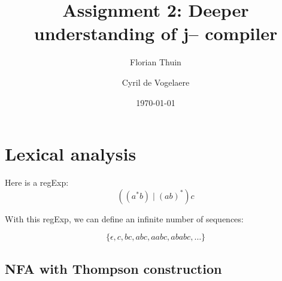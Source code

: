 \documentclass[a4paper, 11pt]{article}
\author{Florian Thuin \and Cyril de Vogelaere}
\date{\today}
\title{Assignment 2: Deeper understanding of j-- compiler}
\begin{document}
    \maketitle
    \tableofcontents
    \section{Lexical analysis}
    Here is a regExp:
    $$ ((a^{*}b) \mid {(ab)}^{*})c $$

    With this regExp, we can define an infinite number of sequences:

    $$ \{ \epsilon, c, bc, abc, aabc, ababc, \ldots \} $$

    \subsection{NFA with Thompson construction}
\end{document}
